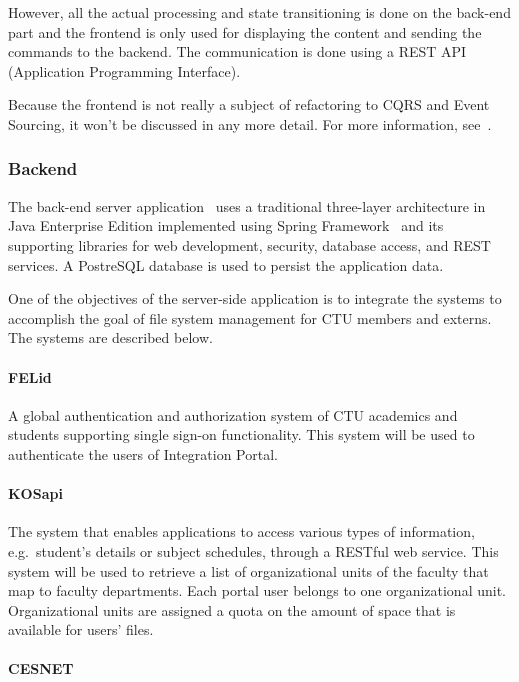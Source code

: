 \documentclass{book}
\begin{document}
However, all the actual processing and state transitioning is done on
the back-end part and the frontend is only used for displaying the
content and sending the commands to the backend. The communication is
done using a REST API (Application Programming Interface).

Because the frontend is not really a subject of refactoring to CQRS and
Event Sourcing, it won't be discussed in any more detail. For more
information, see~\cite{ddd}.

\subsubsection{Backend}\label{backend}

The back-end server application~\cite{backend} uses a traditional
three-layer architecture in Java Enterprise Edition implemented using
Spring Framework~\cite{spring} and its supporting libraries for web development,
security, database access, and REST services. A PostreSQL database is
used to persist the application data.

One of the objectives of the server-side application is to integrate the
systems to accomplish the goal of file system management for CTU members
and externs. The systems are described below.

\paragraph{FELid}\label{felid}

A global authentication and authorization system of CTU academics and
students supporting single sign-on functionality. This system will be
used to authenticate the users of Integration Portal.

\paragraph{KOSapi}\label{kosapi}

The system that enables applications to access various types of
information, e.g.~student's details or subject schedules, through a
RESTful web service. This system will be used to retrieve a list of
organizational units of the faculty that map to faculty departments.
Each portal user belongs to one organizational unit. Organizational
units are assigned a quota on the amount of space that is available for
users' files.

\paragraph{CESNET}\label{cesnet}
\end{document}
